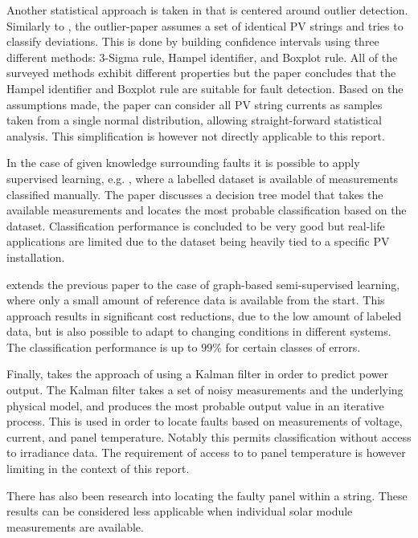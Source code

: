 Another statistical approach is taken in \cite{Zhao2013outlier} that is centered around outlier detection.
Similarly to \cite{Vergura2008,Vergura2009}, the outlier-paper assumes a set of identical PV strings and tries to classify deviations.
This is done by building confidence intervals using three different methods: 3-Sigma rule, Hampel identifier, and Boxplot rule.
All of the surveyed methods exhibit different properties but the paper concludes that the Hampel identifier and Boxplot rule are suitable for fault detection.
Based on the assumptions made, the paper can consider all PV string currents as samples taken from a single normal distribution, allowing straight-forward statistical analysis.
This simplification is however not directly applicable to this report.

In the case of given knowledge surrounding faults it is possible to apply supervised learning, e.g. \cite{Zhao2012tree},
where a labelled dataset is available of measurements classified manually.
The paper discusses a decision tree model that takes the available measurements and locates the most probable classification based on the dataset.
Classification performance is concluded to be very good but real-life applications are limited due to the dataset being heavily tied to a specific PV installation.

\cite{Zhao2013graph} extends the previous paper to the case of graph-based semi-supervised learning, where only a small amount of reference data is available from the start.
This approach results in significant cost reductions, due to the low amount of labeled data, but is also possible to adapt to changing conditions in different systems.
The classification performance is up to $99\%$ for certain classes of errors.

Finally, \cite{Kang2012} takes the approach of using a Kalman filter in order to predict power output.
The Kalman filter takes a set of noisy measurements and the underlying physical model, and produces the most probable output value in an iterative process.
This is used in order to locate faults based on measurements of voltage, current, and panel temperature.
Notably this permits classification without access to irradiance data.
The requirement of access to to panel temperature is however limiting in the context of this report.

There has also been research into locating the faulty panel within a string\cite{Lin2012}.
These results can be considered less applicable when individual solar module measurements are available.

